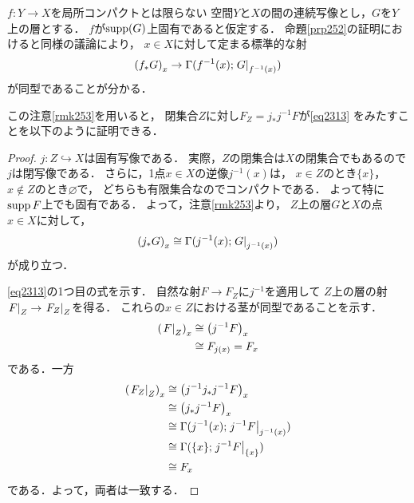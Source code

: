 \begin{RMK}\label{rmk253}
    \(f\colon Y\to X\)を局所コンパクトとは限らない
    空間\(Y\)と\(X\)の間の連続写像とし，\(G\)を\(Y\)上の層とする．
    \(f\)が\(\supp(G)\)上固有であると仮定する．
    命題\ref{prp252}の証明におけると同様の議論により，
    \(x\in X\)に対して定まる標準的な射
    \[
        \left(f_{\ast}G\right)_x
        \to
        \Gamma(f^{-1}(x);\mres[G]{f^{-1}(x)})
    \]
    が同型であることが分かる．
\end{RMK}
\begin{CMT}
    この注意\ref{rmk253}を用いると，
    閉集合\(Z\)に対し\(F_Z=j_{\ast}j^{-1}F\)が\eqref{eq2313}
    をみたすことを以下のように証明できる．
\end{CMT}
\begin{proof}
    \(j\colon Z\hookrightarrow X\)は固有写像である．
    実際，\(Z\)の閉集合は\(X\)の閉集合でもあるので\(j\)は閉写像である．
    さらに，1点\(x\in X\)の逆像\(j^{-1}(x)\)は，
    \(x\in Z\)のとき\(\{x\}\)，\(x\notin Z\)のとき\(\varnothing\)で，
    どちらも有限集合なのでコンパクトである．
    よって特に\(\supp{F}\)上でも固有である．
    よって，注意\ref{rmk253}より，
    \(Z\)上の層\(G\)と\(X\)の点\(x\in X\)に対して，
    \[
        \left(j_{\ast}G\right)_x
        \cong
        \Gamma(j^{-1}(x);\mres[G]{j^{-1}(x)})
    \]
    が成り立つ．
    
    \eqref{eq2313}の1つ目の式を示す．
    自然な射\(F\to F_Z\)に\(j^{-1}\)を適用して
    \(Z\)上の層の射\(\mres[F]{Z}\to\mres[F_Z]{Z}\)を得る．
    これらの\(x\in Z\)における茎が同型であることを示す．
    \begin{align*}
        \left(\mres[F]{Z}\right)_x
        &\cong \left(j^{-1}F\right)_x\\
        &\cong F_{j(x)}=F_x
    \end{align*}
    である．一方
    \begin{align*}
        \left(\mres[F_Z]{Z}\right)_x
        &\cong \left(j^{-1}j_{\ast}j^{-1}F\right)_x\\
        &\cong \left(j_{\ast}j^{-1}F\right)_x\\
        &\cong \Gamma(j^{-1}(x);\mres[j^{-1}F]{j^{-1}(x)})\\
        &\cong \Gamma(\{x\};\mres[j^{-1}F]{\{x\}})\\
        &\cong F_x
    \end{align*}
    である．よって，両者は一致する．


\end{proof}
